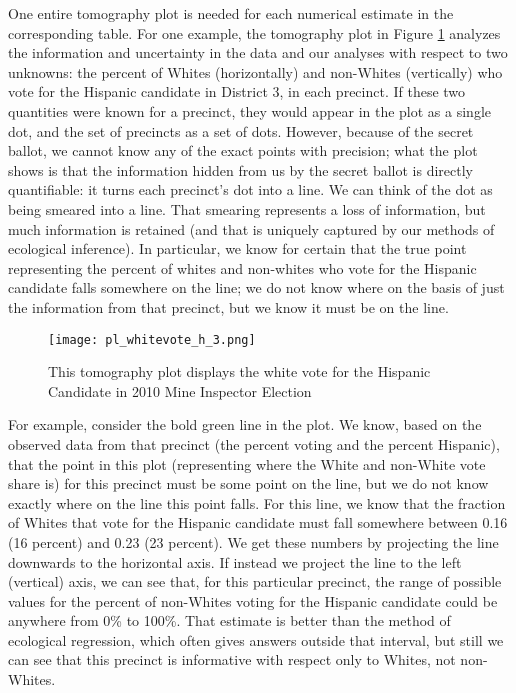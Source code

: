 \documentclass[12pt,draft]{scrartcl}
\begin{document}
One entire tomography plot is needed for each numerical estimate in
the corresponding table. For one example, the tomography plot in
Figure \ref{tomog} analyzes the information and uncertainty in the
data and our analyses with respect to two unknowns: the percent of
Whites (horizontally) and non-Whites (vertically) who vote for the
Hispanic candidate in District 3, in each precinct.  If these two
quantities were known for a precinct, they would appear in the plot as
a single dot, and the set of precincts as a set of dots.  However,
because of the secret ballot, we cannot know any of the exact points
with precision; what the plot shows is that the information hidden
from us by the secret ballot is directly quantifiable: it turns each
precinct's dot into a line.  We can think of the dot as being smeared
into a line. That smearing represents a loss of information, but much
information is retained (and that is uniquely captured by our methods
of ecological inference).  In particular, we know for certain that the
true point representing the percent of whites and non-whites who vote
for the Hispanic candidate falls somewhere on the line; we do not know
where on the basis of just the information from that precinct, but we
know it must be on the line.

\begin{figure}[htb]
\begin{centering}
\texttt{[image: pl\_whitevote\_h\_3.png]}
\caption{This tomography plot displays the white vote for the Hispanic
  Candidate in 2010 Mine Inspector Election}
\end{centering}
\label{tomog}
\end{figure}

For example, consider the bold green line in the plot. We know, based
on the observed data from that precinct (the percent voting and the
percent Hispanic), that the point in this plot (representing where the
White and non-White vote share is) for this precinct must be some
point on the line, but we do not know exactly where on the line this
point falls. For this line, we know that the fraction of Whites that
vote for the Hispanic candidate must fall somewhere between 0.16 (16
percent) and 0.23 (23 percent). We get these numbers by projecting the
line downwards to the horizontal axis. If instead we project the line
to the left (vertical) axis, we can see that, for this particular
precinct, the range of possible values for the percent of non-Whites
voting for the Hispanic candidate could be anywhere from 0\% to 100\%.
That estimate is better than the method of ecological regression,
which often gives answers outside that interval, but still we can see
that this precinct is informative with respect only to Whites, not
non-Whites. 
\end{document}
